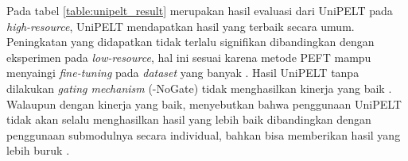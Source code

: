 \begin{table}[ht]
    \vspace{0.25cm}
    \centering
    \caption{Hasil evaluasi UniPELT pada \textit{high-resource} \parencite{unipelt}}
    \label{table:unipelt_result}
\end{table}

Pada tabel \ref{table:unipelt_result} merupakan hasil evaluasi dari UniPELT pada \textit{high-resource}, UniPELT mendapatkan hasil yang terbaik secara umum. Peningkatan yang didapatkan tidak terlalu signifikan dibandingkan dengan eksperimen pada \textit{low-resource}, hal ini sesuai karena metode PEFT mampu menyaingi \textit{fine-tuning} pada \textit{dataset} yang banyak \parencite{unipelt}. Hasil UniPELT tanpa dilakukan \textit{gating mechanism} (-NoGate) tidak menghasilkan kinerja yang baik \parencite{unipelt}. Walaupun dengan kinerja yang baik, \citeauthor{unipelt} menyebutkan bahwa penggunaan UniPELT tidak akan selalu menghasilkan hasil yang lebih baik dibandingkan dengan penggunaan submodulnya secara individual, bahkan bisa memberikan hasil yang lebih buruk \parencite{unipelt}.
